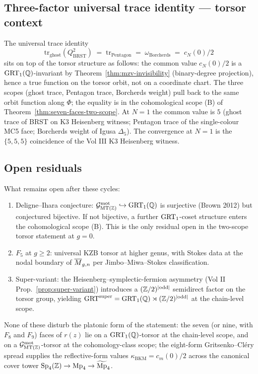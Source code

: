 \subsection*{Three-factor universal trace identity --- torsor context}

The universal trace identity
\[
  \mathrm{tr}_{\mathrm{ghost}}(Q_{\mathrm{BRST}}^2)
  \;=\; \mathrm{tr}_{\mathrm{Pentagon}}
  \;=\; \omega_{\mathrm{Borcherds}}
  \;=\; c_N(0)/2
\]
sits on top of the torsor structure as follows: the common value
$c_N(0)/2$ is a $\mathrm{GRT}_1(\mathbb{Q})$-invariant by Theorem~\ref{thm:mzv-invisibility}
(binary-degree projection), hence a true function on the torsor
orbit, not on a coordinate chart. The three scopes (ghost trace,
Pentagon trace, Borcherds weight) pull back to the same orbit
function along $\Phi$; the equality is in the cohomological scope (B)
of Theorem~\ref{thm:seven-faces-two-scope}. At $N = 1$ the common
value is $5$ (ghost trace of BRST on K3 Heisenberg witness; Pentagon
trace of the single-colour MC5 face; Borcherds weight of Igusa
$\Delta_5$). The convergence at $N = 1$ is the $\{5, 5, 5\}$
coincidence of the Vol III K3 Heisenberg witness.

\subsection*{Open residuals}

What remains open after these cycles:
\begin{enumerate}
\item Deligne--Ihara conjecture: $\mathcal{G}^{\mathrm{mot}}_{\mathrm{MT}(\mathbb{Z})} \hookrightarrow \mathrm{GRT}_1(\mathbb{Q})$
is surjective (Brown 2012) but conjectured bijective. If not bijective,
a further $\mathrm{GRT}_1$-coset structure enters the cohomological scope (B).
This is the only residual open in the two-scope torsor statement at $g = 0$.
\item $F_5$ at $g \ge 2$: universal KZB torsor at higher genus,
with Stokes data at the nodal boundary of $\overline{M}_{g,n}$ per
Jimbo--Miwa--Stokes classification.
\item Super-variant: the Heisenberg--symplectic-fermion asymmetry
(Vol II Prop.~\ref{prop:super-variant}) introduces a
$(\mathbb{Z}/2)^{|\mathrm{odd}|}$ semidirect factor on the torsor group,
yielding $\mathrm{GRT}^{\mathrm{super}} = \mathrm{GRT}_1(\mathbb{Q}) \rtimes (\mathbb{Z}/2)^{|\mathrm{odd}|}$
at the chain-level scope.
\end{enumerate}

None of these disturb the platonic form of the statement: the seven
(or nine, with $F_8$ and $F_9$) faces of $r(z)$ lie on a
$\mathrm{GRT}_1(\mathbb{Q})$-torsor at the chain-level scope, and on a
$\mathcal{G}^{\mathrm{mot}}_{\mathrm{MT}(\mathbb{Z})}$-torsor at the cohomology-class scope; the
eight-form Gritsenko--Cl\'ery spread supplies the reflective-form
values $\kappa_{\mathrm{BKM}} = c_m(0)/2$ across the canonical cover
tower $\mathrm{Sp}_4(\mathbb{Z}) \to \mathrm{Mp}_4 \to \widetilde{\mathrm{Mp}}_4$.

